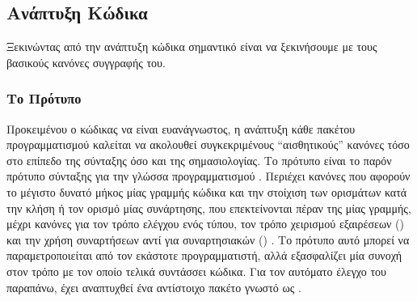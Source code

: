 \subsection{Ανάπτυξη Κώδικα}
Ξεκινώντας από την ανάπτυξη κώδικα σημαντικό είναι να ξεκινήσουμε με τους βασικούς κανόνες συγγραφής του.
\subsubsection{Το Πρότυπο }
Προκειμένου ο κώδικας να είναι ευανάγνωστος, η ανάπτυξη κάθε πακέτου προγραμματισμού  καλείται να ακολουθεί συγκεκριμένους ``αισθητικούς'' κανόνες τόσο στο επίπεδο της σύνταξης όσο και της σημασιολογίας.
Το πρότυπο  είναι το παρόν πρότυπο σύνταξης για την γλώσσα προγραμματισμού .
Περιέχει κανόνες που αφορούν το μέγιστο δυνατό μήκος μίας γραμμής κώδικα και την στοίχιση των ορισμάτων κατά την κλήση ή τον ορισμό μίας συνάρτησης, που επεκτείνονται πέραν της μίας γραμμής, μέχρι κανόνες για τον τρόπο ελέγχου ενός τύπου, τον τρόπο χειρισμού εξαιρέσεων () και την χρήση συναρτήσεων αντί για συναρτησιακών () \cite{PEP8}.
Το πρότυπο αυτό μπορεί να παραμετροποιείται από τον εκάστοτε προγραμματιστή, αλλά εξασφαλίζει μία συνοχή στον τρόπο με τον οποίο τελικά συντάσσει κώδικα.
Για τον αυτόματο έλεγχο του παραπάνω, έχει αναπτυχθεί ένα αντίστοιχο πακέτο γνωστό ως \href{https://pypi.org/project/flake8/}{}.
